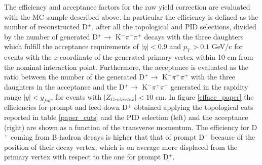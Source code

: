 \documentclass[b5paper,10pt,twoside,oldstyle,classica]{toptesi}
\newcommand{\pt}{p_\text{T}}
\begin{document}
The efficiency and acceptance factors for the raw yield correction are evaluated with the MC sample described above. In particular the efficiency is defined as the number of reconstructed D$^+$, after all the topological and PID selections, divided by the number of generated D$^+\rightarrow$ K$^-\pi^+\pi^+$ decays with the three daughters which fulfill the acceptance requirements of $|\eta| <0.9$ and $\pt > 0.1$ GeV/c for events with the $z$-coordinate of the generated primary vertex within 10 cm from the nominal interaction point. Furthermore, the acceptance is evaluated as the ratio between the number of the generated D$^+\rightarrow$ K$^-\pi^+\pi^+$ with the three daughters in the acceptance and the D$^+\rightarrow$ K$^-\pi^+\pi^+$ generated in the rapidity range $|y| < y_{fid}$, for events with $|Z_{GenVertex}| < 10$ cm. In figure \ref{effacc_paper} the efficiencies for prompt and feed-down D$^+$ obtained applying the topological cuts reported in table \ref{paper_cuts} and the PID selection (left) and the acceptance (right) are shown as a function of the transverse momentum. The efficiency for D$^+$ coming from B-hadron decays is higher that that of prompt D$^+$ because of the position of their decay vertex, which is on average more displaced from the primary vertex with respect to the one for prompt D$^+$. 
\end{document}
